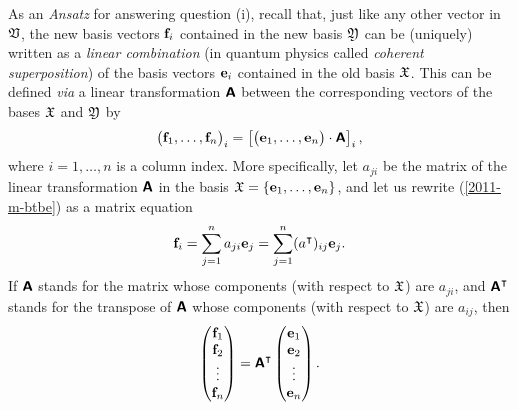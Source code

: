 As an {\it Ansatz} for answering question (i), recall that, just like any other vector in ${\frak V}$,
the new basis vectors ${\bf f}_i$ contained in the new basis ${\frak Y}$
can be (uniquely) written as a {\em linear combination}
(in quantum physics called {\em coherent superposition})
of the basis vectors
${\bf e}_i$ contained in the old  basis ${\frak X}$.
This can be defined {\it via}
a linear transformation $\textsf{\textbf{A}}$ between the corresponding vectors of the bases
 ${\frak X}$ and
${\frak Y}$ by
\begin{equation}
\begin{pmatrix}{\bf f}_1,\ldots ,{\bf f}_n\end{pmatrix}_i= \left[\begin{pmatrix}{\bf e}_1,\ldots ,{\bf e}_n\end{pmatrix} \cdot \textsf{\textbf{A}}\right]_i
,
\label{2011-m-btbe}
\end{equation}
where $i=1, \ldots , n$ is a column index.
%
More specifically, let ${a}_{ji}$ be the matrix of the linear transformation $\textsf{\textbf{A}}$
in the basis
${\frak X}
=
\{
{\bf e}_1,
\ldots ,
{\bf e}_n
\}$,
and let us rewrite (\ref{2011-m-btbe}) as a matrix equation
\begin{equation}
{\bf f}_i= \sum_{j=1}^n a_{ji} {\bf e}_j   = \sum_{j=1}^n (a^\intercal )_{ij} {\bf e}_j
.
\label{2011-m-btbe-r}
\end{equation}
If $\textsf{\textbf{A}}$ stands for the matrix whose components (with respect to ${\frak X}$) are  $a_{ji}$,
and $\textsf{\textbf{A}}^\intercal $
stands for the transpose of $\textsf{\textbf{A}}$
whose components (with respect to ${\frak X}$) are  $a_{ij}$,
then
\begin{equation}
\begin{pmatrix}
{\bf f}_1\\
{\bf f}_2\\
\vdots\\
{\bf f}_n
\end{pmatrix}
= \textsf{\textbf{A}}^\intercal
\begin{pmatrix}
{\bf e}_1\\
{\bf e}_2\\
\vdots\\
{\bf e}_n
\end{pmatrix}
.
\label{2011-m-btbe-r1}
\end{equation}

